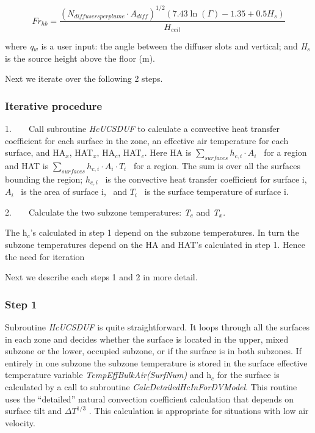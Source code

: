 \begin{equation}
F{r_{hb}} = \frac{{{{({N_{diffusersperplume}}\cdot {A_{diff}})}^{1/2}}(7.43\ln (\Gamma ) - 1.35 + 0.5{H_s})}}{{{H_{ceil}}}}
\end{equation}

where \emph{q\(_{w}\)} is a user input: the angle between the diffuser slots and vertical; and \emph{H\(_{s}\)} is the source height above the floor (m).

Next we iterate over the following 2 steps.

\subsubsection{Iterative procedure}\label{iterative-procedure-1}

1.~~~~Call subroutine \emph{HcUCSDUF} to calculate a convective heat transfer coefficient for each surface in the zone, an effective air temperature for each surface, and HA\(_{x}\), HAT\(_{x}\), HA\(_{c}\), HAT\(_{c}\). Here HA is \(\sum\limits_{surfaces} {{h_{c,i}} \cdot {A_i}}\) ~for a region and HAT is \(\sum\limits_{surfaces} {{h_{c,i}} \cdot {A_i}} \cdot {T_i}\) ~for a region. The sum is over all the surfaces bounding the region; \({{h_{c,i}}}\) ~is the convective heat transfer coefficient for surface i, \({A_i}\) ~is the area of surface i,~ and \({T_i}\) ~is the surface temperature of surface i.

2.~~~~Calculate the two subzone temperatures: \emph{T\(_{c}\)} and \emph{T\(_{x}\)}.

The h\(_{c}\)'s calculated in step 1 depend on the subzone temperatures. In turn the subzone temperatures depend on the HA and HAT's calculated in step 1. Hence the need for iteration

Next we describe each steps 1 and 2 in more detail.

\subsubsection{Step 1}\label{step-1-1}

Subroutine \emph{HcUCSDUF} is quite straightforward. It loops through all the surfaces in each zone and decides whether the surface is located in the upper, mixed subzone or the lower, occupied subzone, or if the surface is in both subzones. If entirely in one subzone the subzone temperature is stored in the surface effective temperature variable \emph{TempEffBulkAir(SurfNum)} and h\(_{c}\) for the surface is calculated by a call to subroutine \emph{CalcDetailedHcInForDVModel}. This routine uses the ``detailed'' natural convection coefficient calculation that depends on surface tilt and \(\Delta {T^{1/3}}\) . This calculation is appropriate for situations with low air velocity.

